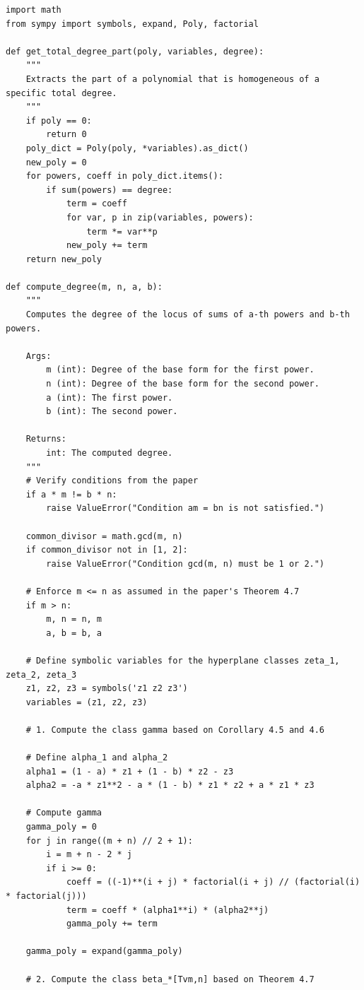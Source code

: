 \documentclass[reqno, 11pt]{amsart}
\theoremstyle{plain}
\theoremstyle{remark}
\begin{document}
\begin{lstlisting}[basicstyle=\ttfamily\tiny]  
import math
from sympy import symbols, expand, Poly, factorial

def get_total_degree_part(poly, variables, degree):
    """
    Extracts the part of a polynomial that is homogeneous of a specific total degree.
    """
    if poly == 0:
        return 0
    poly_dict = Poly(poly, *variables).as_dict()
    new_poly = 0
    for powers, coeff in poly_dict.items():
        if sum(powers) == degree:
            term = coeff
            for var, p in zip(variables, powers):
                term *= var**p
            new_poly += term
    return new_poly

def compute_degree(m, n, a, b):
    """
    Computes the degree of the locus of sums of a-th powers and b-th powers.

    Args:
        m (int): Degree of the base form for the first power.
        n (int): Degree of the base form for the second power.
        a (int): The first power.
        b (int): The second power.

    Returns:
        int: The computed degree.
    """
    # Verify conditions from the paper 
    if a * m != b * n:
        raise ValueError("Condition am = bn is not satisfied.")

    common_divisor = math.gcd(m, n)
    if common_divisor not in [1, 2]:
        raise ValueError("Condition gcd(m, n) must be 1 or 2.")

    # Enforce m <= n as assumed in the paper's Theorem 4.7
    if m > n:
        m, n = n, m
        a, b = b, a

    # Define symbolic variables for the hyperplane classes zeta_1, zeta_2, zeta_3
    z1, z2, z3 = symbols('z1 z2 z3')
    variables = (z1, z2, z3)

    # 1. Compute the class gamma based on Corollary 4.5 and 4.6 

    # Define alpha_1 and alpha_2 
    alpha1 = (1 - a) * z1 + (1 - b) * z2 - z3
    alpha2 = -a * z1**2 - a * (1 - b) * z1 * z2 + a * z1 * z3

    # Compute gamma 
    gamma_poly = 0
    for j in range((m + n) // 2 + 1):
        i = m + n - 2 * j
        if i >= 0:
            coeff = ((-1)**(i + j) * factorial(i + j) // (factorial(i) * factorial(j)))
            term = coeff * (alpha1**i) * (alpha2**j)
            gamma_poly += term

    gamma_poly = expand(gamma_poly)

    # 2. Compute the class beta_*[Tvm,n] based on Theorem 4.7


\end{lstlisting}
\end{document}
